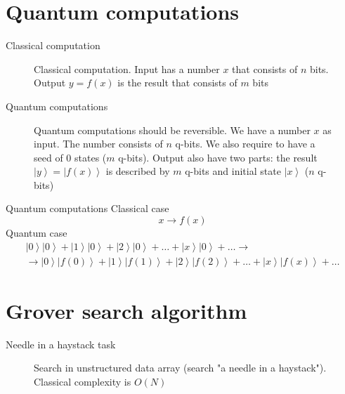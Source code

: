 \documentclass[10pt,pdf,hyperref={unicode}]{beamer}
\begin{document}
\section{Quantum computations}

\begin{frame}{Classical computation}
\begin{figure}
\centering



\caption{Classical computation. Input has a number $x$ that consists
  of  $n$ bits. Output $y = f\left(x\right)$ is the result that
  consists of $m$ bits}
\label{figQuantCompClassComp}
\end{figure}
\end{frame}

\begin{frame}{Quantum computations}
\begin{figure}
\centering

\scalebox{.8}{}

\caption{Quantum computations should be reversible. We have a number
  $x$ as input. The number consists of $n$ q-bits. We also require to
  have a seed of $0$ states ($m$ q-bits). Output also have two parts: the result $\left|y\right> =
  \left|f\left(x\right)\right>$ is described by $m$ q-bits and initial
  state $\left|x\right>$ ($n$ q-bits)} 
\label{figQuantCompQuantComp}
\end{figure}
\end{frame}


\begin{frame}{Quantum computations}
Classical case
\[
x \to f(x)
\]
Quantum case
\begin{eqnarray}
\left|0\right>\left|0\right> + \left|1\right>\left|0\right> + \left|2\right>\left|0\right> +
\dots + \left|x\right>\left|0\right> + \dots \to
\nonumber \\
\to 
\left|0\right>\left|f(0)\right> + \left|1\right>\left|f(1)\right> + \left|2\right>\left|f(2)\right> +
\dots + \left|x\right>\left|f(x)\right> + \dots
\nonumber
\end{eqnarray}
\end{frame}


\section{Grover search algorithm}
\begin{frame}{Needle in a haystack task}
\begin{figure}
\centering



\caption{Search in unstructured data array (search "a needle in a
  haystack"). Classical complexity is $O(N)$}
\label{figQuantCompSearch}
\end{figure}
\end{frame}
\end{document}
